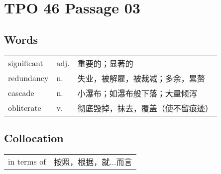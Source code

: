 \section{TPO 46 Passage 03}

\subsection{Words}

\begin{tabular}{lll}
    significant & adj. & 重要的；显著的           \\
    redundancy  & n.   & 失业，被解雇，被裁减；多余，累赘  \\
    cascade     & n.   & 小瀑布；如瀑布般下落；大量倾泻   \\
    obliterate  & v.   & 彻底毁掉，抹去，覆盖（使不留痕迹） \\
\end{tabular}

\subsection{Collocation}

\begin{tabular}{ll}
    in terms of & 按照，根据，就...而言 \\
\end{tabular}

